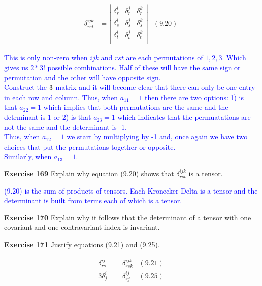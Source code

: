 \documentclass[12pt,a4paper]{report}
\newcommand{\BLUE}[1]{\textcolor{blue}{#1}}
\begin{document}
\begin{description}
\begin{align*}
	\delta_{rst}^{ijk} &= \left |\begin{array}{ccc}
		\delta_r^i & \delta_r^j & \delta_r^k \\
		\delta_s^i & \delta_s^j & \delta_s^k \\
		\delta_t^i & \delta_t^j & \delta_t^k \\
	\end{array} \right | & (9.20)
\end{align*}


\BLUE{This is only non-zero when $ijk$ and $rst$ are each permutations of $1, 2,3$.  Which gives us $2 * 3!$ possible combinations.  Half of these will have the same sign or permutation and the other will have opposite sign.\\
Construct the $3 \time 3$ matrix and it will become clear that there can only be one entry in each row and column.  Thus, when $a_{11}=1$ then there are two options: 1) is that $a_{22}=1$ which implies that both permutations are the same and the detrminant is 1  or 2) is that $a_{23}=1$ which indicates that the permuatations are not the same and the determinant is -1.\\
Thus, when $a_{12}=1$ we start by multiplying by -1 and, once again we have two choices that put the permutations together or opposite.\\
Similarly, when $a_{13}=1$.
}

\item \textbf{Exercise 169} Explain why equation (9.20) shows that $\delta_{rst}^{ijk}$ is a tensor.

\BLUE{(9.20) is the sum of products of tensors.  Each Kronecker Delta is a tensor and the determinant is built from terms each of which is a tensor.
}
\item \textbf{Exercise 170} Explain why it follows that the determinant of a tensor with one covariant and one contravariant index is invariant.
\item \textbf{Exercise 171} Justify equations (9.21) and (9.25).

\begin{align*}
	\delta_{rs}^{ij} &= \delta_{rsk}^{ijk} & (9.21)\\
	3\delta_j^i &= \delta_{rj}^{ij} & (9.25)
\end{align*}


\end{description}
\end{document}
